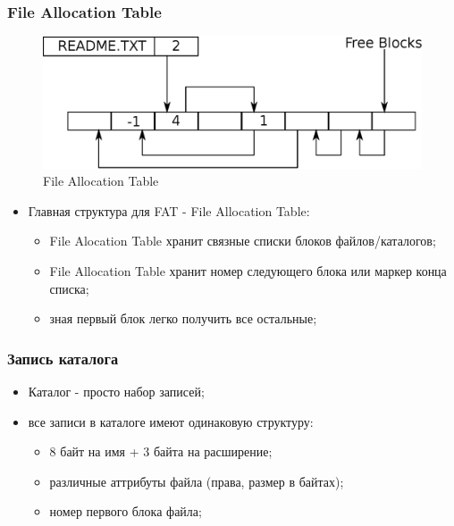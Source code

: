 \begin{frame}
\frametitle{File Allocation Table}
\begin{figure}
  \centering\includegraphics[width=.6\linewidth]{fat}
  \caption{File Allocation Table}
\end{figure}
\begin{itemize}
  \item Главная структура для FAT - File Allocation Table:
    \begin{itemize}
      \item File Alocation Table хранит связные списки блоков файлов/каталогов;
      \item File Allocation Table хранит номер следующего блока или маркер конца списка;
      \item зная первый блок легко получить все остальные;
    \end{itemize}
\end{itemize}
\end{frame}

\begin{frame}
\frametitle{Запись каталога}
\begin{itemize}
  \item Каталог - просто набор записей;
  \item все записи в каталоге имеют одинаковую структуру:
    \begin{itemize}
      \item 8 байт на имя + 3 байта на расширение;
      \item различные аттрибуты файла (права, размер в байтах);
      \item номер первого блока файла;
    \end{itemize}
\end{itemize}
\end{frame}
